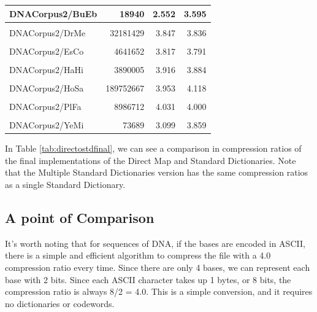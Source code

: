 \documentclass[12pt,twoside]{reedthesis}
\begin{document}
\begin{table}[!h]
{\begin{tabular}[t]{l|r|r|r}
\hline
DNACorpus2/BuEb & 18940 & 2.552 & 3.595\\
\hline
\cellcolor{gray!6}{DNACorpus2/DaRe} & \cellcolor{gray!6}{62565020} & \cellcolor{gray!6}{3.928} & \cellcolor{gray!6}{4.013}\\
\hline
DNACorpus2/DrMe & 32181429 & 3.847 & 3.836\\
\hline
\cellcolor{gray!6}{DNACorpus2/EnIn} & \cellcolor{gray!6}{26403087} & \cellcolor{gray!6}{3.918} & \cellcolor{gray!6}{3.893}\\
\hline
DNACorpus2/EsCo & 4641652 & 3.817 & 3.791\\
\hline
\cellcolor{gray!6}{DNACorpus2/GaGa} & \cellcolor{gray!6}{148532294} & \cellcolor{gray!6}{3.776} & \cellcolor{gray!6}{3.943}\\
\hline
DNACorpus2/HaHi & 3890005 & 3.916 & 3.884\\
\hline
\cellcolor{gray!6}{DNACorpus2/HePy} & \cellcolor{gray!6}{1667825} & \cellcolor{gray!6}{3.884} & \cellcolor{gray!6}{3.894}\\
\hline
DNACorpus2/HoSa & 189752667 & 3.953 & 4.118\\
\hline
\cellcolor{gray!6}{DNACorpus2/OrSa} & \cellcolor{gray!6}{43262523} & \cellcolor{gray!6}{3.843} & \cellcolor{gray!6}{3.858}\\
\hline
DNACorpus2/PlFa & 8986712 & 4.031 & 4.000\\
\hline
\cellcolor{gray!6}{DNACorpus2/ScPo} & \cellcolor{gray!6}{10652155} & \cellcolor{gray!6}{3.847} & \cellcolor{gray!6}{3.813}\\
\hline
DNACorpus2/YeMi & 73689 & 3.099 & 3.859\\
\hline
\end{tabular}}
\end{table}
In Table \ref{tab:directostdfinal}, we can see a comparison in compression ratios of the final implementations of the Direct Map and Standard Dictionaries. Note that the Multiple Standard Dictionaries version has the same compression ratios as a single Standard Dictionary.

\hypertarget{a-point-of-comparison}{%
\subsection{A point of Comparison}\label{a-point-of-comparison}}

It's worth noting that for sequences of DNA, if the bases are encoded in ASCII, there is a simple and efficient algorithm to compress the file with a 4.0 compression ratio every time. Since there are only 4 bases, we can represent each base with 2 bits. Since each ASCII character takes up 1 bytes, or 8 bits, the compression ratio is always 8/2 = 4.0. This is a simple conversion, and it requires no dictionaries or codewords.
\end{document}
